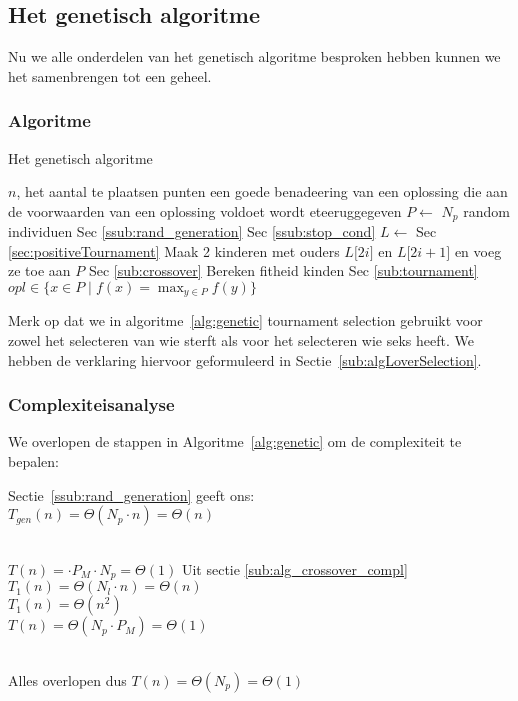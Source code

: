 %
\subsection{Het genetisch algoritme}
\label{ssub:genetic}
Nu we alle onderdelen van het genetisch algoritme besproken hebben kunnen we het samenbrengen tot een geheel.

\subsubsection{Algoritme}
	\begin{algorithm}
	 	\caption{Het genetisch algoritme}
		\begin{algorithmic}
		\Require $n$, het aantal te plaatsen punten
		\Ensure een goede benadeering van een oplossing die aan de voorwaarden van een oplossing voldoet wordt eteeruggegeven
		\State $P \gets $ $N_p$ random individuen 
		\Comment Sec \ref{ssub:rand_generation}
		\Comment Sec \ref{ssub:stop_cond}
			\State $L \gets$  
			\Comment Sec \ref{sec:positiveTournament}
				\State Maak 2 kinderen met ouders 
				\State $L\lbrack2i\rbrack$ en  $L\lbrack2i+1\rbrack$ en voeg ze 
				\State toe aan $P$ 
				\Comment Sec \ref{sub:crossover}
				\State Bereken fitheid kinden
			\EndFor
			\State {} 
			\Comment Sec \ref{sub:tournament}
		\EndWhile 
		\State \Return  $\displaystyle opl \in \lbrace x \in P \mid f(x) = \max_{y\in P}{f(y)}  \rbrace$
		\EndFunction
		\end{algorithmic}
		\label{alg:genetic}
	\end{algorithm}		
    Merk op dat we in algoritme~\ref{alg:genetic} tournament selection gebruikt voor zowel het selecteren van wie sterft als voor het selecteren wie seks heeft. We hebben de verklaring hiervoor geformuleerd in Sectie~\ref{sub:algLoverSelection}. 
\subsubsection{Complexiteisanalyse}
  We overlopen de stappen in Algoritme~\ref{alg:genetic} om de complexiteit te bepalen:
\begin{enumerate}
	 Sectie~\ref{ssub:rand_generation} geeft ons:\\ $T_{gen}(n)=\Theta(N_p\cdot n) = \Theta(n)$ 
		\begin{enumerate}
			 \\$T(n)= \cdot P_M \cdot N_p = \Theta(1)$ 
			 Uit sectie \ref{sub:alg_crossover_compl}\\$T_{\text{1}}(n)= \Theta(N_l\cdot n) = \Theta(n)$
			 \\$T_{\text{1}}(n)= \Theta(n^2)$
			 \\$T(n)= \Theta(N_p\cdot P_M) = \Theta(1)$
		\end{enumerate}
		\\Alles overlopen dus $T(n)=\Theta(N_p)=\Theta(1)$
\end{enumerate}


